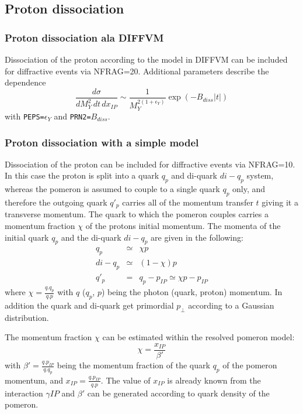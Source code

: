 \documentclass[10pt]{article} \usepackage{dina4}
\newcommand{\PO}{\ensuremath{ I\! \! P} }
\newcommand{\pom}{I\!\!P}
\newcommand{\xpom}{x_{\pom}}
\begin{document}
\subsection{Proton dissociation}
\subsubsection{Proton dissociation ala DIFFVM}
Dissociation of the proton 
according to the model in DIFFVM \cite{DIFFVM,DIFFVM2}
can be included for diffractive events 
via NFRAG=20. Additional parameters describe the dependence
$$
\frac{d \sigma }{dM_Y^2\,dt\,dx_{\PO}} \sim 
\frac{1}{M_Y^{2(1+\epsilon_Y)}}
\exp{\left(-B_{diss}|t|\right)} $$
with \verb+PEPS=+$\epsilon_Y$ and \verb+PRN2=+$B_{diss}$.
\subsubsection{Proton dissociation with a simple model}
Dissociation of the proton can be included for diffractive events 
via NFRAG=10.
 In this case the proton is split into a quark $q_p$ and di-quark $di-q_p$
system, whereas the pomeron is assumed to couple to a single quark 
$q_p$ only, 
and therefore the outgoing quark $q'_p$ carries 
 all of the momentum transfer $t$ giving it a transverse momentum. 
The quark to which the pomeron 
couples carries a momentum fraction $\chi$ of the protons initial
momentum. The momenta of the initial quark $q_p$ and the di-quark
$di-q_p$ are given in the following:
\begin{eqnarray}
q_p & \simeq & \chi p \\
di-q_p & \simeq & (1 - \chi) p \\
q'_p & = & q_p - p_{\PO} \simeq  \chi p - p_{\PO}
\end{eqnarray}
where  
$ \chi = \frac{q.q_p}{q.p}$ with
$q$ ($q_p$, $p$) being the photon (quark, proton) momentum.
 In addition the quark and
di-quark get primordial $p_{\perp}$ according to a Gaussian 
distribution. 
\par
The momentum fraction $\chi$ can be estimated within the 
resolved pomeron model:
\begin{equation}
\chi = \frac{\xpom}{\beta'}
\end{equation}
with $\beta' = \frac{q.p_{\PO}}{q.q_p}$ 
being the momentum fraction of the quark $q_p$ of the pomeron momentum,
and  $x_{\PO} = \frac{q.p_{\PO}}{q.p}$.
The value of $\xpom$ is already known from the interaction $\gamma \PO$
and $\beta'$ can be generated according to quark density of the pomeron.
\end{document}
